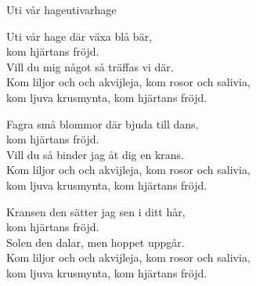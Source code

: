 \begin{song}{Uti vår hage}{utivarhage}
\vspace{0.5cm}
\begin{vers}
Uti vår hage där växa blå bär,\\ 
kom hjärtans fröjd.\\
Vill du mig något så träffas vi där.\\
Kom liljor och och akvijleja, kom rosor och salivia,\\ 
kom ljuva krusmynta, kom hjärtans fröjd.\\
\end{vers}
\begin{vers}
Fagra små blommor där bjuda till dans,\\
kom hjärtans fröjd.\\
Vill du så binder jag åt dig en krans.\\
Kom liljor och och akvijleja, kom rosor och salivia,\\ 
kom ljuva krusmynta, kom hjärtans fröjd.\\
\end{vers}
\begin{vers}
Kransen den sätter jag sen i ditt hår,\\ 
kom hjärtans fröjd.\\
Solen den dalar, men hoppet uppgår.\\
Kom liljor och och akvijleja, kom rosor och salivia,\\ 
kom ljuva krusmynta, kom hjärtans fröjd.\\
\end{vers}
\end{song}
\newpage

